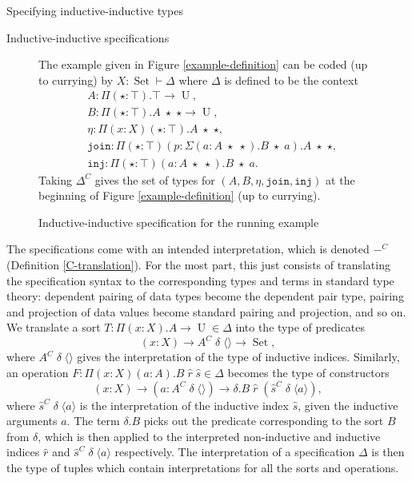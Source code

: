 \documentclass[runningheads]{llncs}
\DeclareMathOperator{\USet}{Set}
\DeclareMathOperator{\UU}{U}
\newcommand{\tac}{\vdash}
\newcommand{\join}{\texttt{join}}
\newcommand{\inj}{\texttt{inj}}
\def\emptytuple{\langle\rangle}
\begin{document}
{\begin{section}{Specifying inductive-inductive types}
\begin{subsection}{Inductive-inductive specifications}
\begin{figure}[htpb]\begin{flushleft}
    The example given in Figure \ref{example-definition} can be coded (up to currying) by $X : \USet \tac \Delta$ where $\Delta$ is defined to be the context \begin{align*}& A : \Pi(\star : \top).\top \to \UU,\\& B : \Pi(\star : \top).A\;\star\;\star \to \UU,\\& \eta : \Pi(x : X)(\star : \top).A\;\star\;\star, \\&\join : \Pi(\star : \top)(p : \Sigma(a : A\;\star\;\star).B\;\star\;a).A\;\star\;\star,\\& \inj : \Pi(\star : \top)(a : A\;\star\;\star).B\;\star\;a.\end{align*}
    Taking $\Delta^C$ gives the set of types for $(A, B, \eta, \join, \inj)$ at the beginning of Figure \ref{example-definition} (up to currying).
    
    \caption{\label{example-code}Inductive-inductive specification for the running example}
\end{flushleft}\end{figure}

The specifications come with an intended interpretation, which is denoted $-^C$ (Definition \ref{C-translation}).
For the most part, this just consists of translating the specification syntax to the corresponding types and terms in standard type theory: dependent pairing of data types become the dependent pair type, pairing and projection of data values become standard pairing and projection, and so on.
We translate a sort $T : \Pi(x : X).A \to \UU \in \Delta$ into the type of predicates \[(x : X) \to A^C\;\delta\;\emptytuple \to \USet,\] where $A^C\;\delta\;\emptytuple$ gives the interpretation of the type of inductive indices. Similarly, an operation $F : \Pi(x : X)(a : A).B\;\hat{r}\;\hat{s} \in \Delta$ becomes the type of constructors \[(x : X) \to (a : A^C\;\delta\;\emptytuple) \to \delta.B\;\hat{r}\;(\hat{s}^C\;\delta\;\langle a \rangle),\] where $\hat{s}^C\;\delta\;\langle a\rangle$ is the interpretation of the inductive index $\hat{s}$, given the inductive arguments $a$. The term $\delta.B$ picks out the predicate corresponding to the sort $B$ from $\delta$, which is then applied to the interpreted non-inductive and inductive indices $\hat{r}$ and $\hat{s}^C\;\delta\;\langle a \rangle$ respectively. The interpretation of a specification $\Delta$ is then the type of tuples which contain interpretations for all the sorts and operations.


\end{subsection}
\end{section}}
\end{document}
